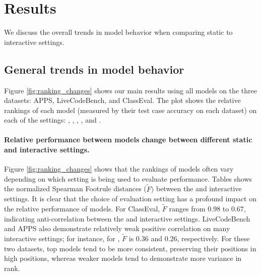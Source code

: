 

\section{Results}
We discuss the overall trends in model behavior when comparing static to interactive settings. 




\subsection{General trends in model behavior}
Figure \ref{fig:ranking_changes} shows our main results using all \nmodels{} models on the three datasets: APPS, LiveCodeBench, and ClassEval.
The plot shows the relative rankings of each model (measured by their test case accuracy on each dataset) on each of the settings: \vanilla, \para, \sent, \cf, and \ir.

\paragraph{Relative performance between models change between different static and interactive settings.} 
Figure \ref{fig:ranking_changes} shows that the rankings of models often vary depending on which setting is being used to evaluate performance. 
Tables  shows the normalized Spearman Footrule distances ($\tilde{F})$ between the \vanilla{} and interactive settings. 
It is clear that the choice of evaluation setting has a profound impact on the relative performance of models. 
For ClassEval, $\tilde{F}$ ranges from $0.98$ to $0.67$, indicating anti-correlation between the \vanilla{} and interactive settings.
LiveCodeBench and APPS also demonstrate relatively weak positive correlation on many interactive settings; for instance, for \cf, $\tilde{F}$ is $0.36$ and $0.26$, respectively.
For these two datasets, top models tend to be more consistent, preserving their positions in high positions, whereas weaker models tend to demonstrate more variance in rank.


